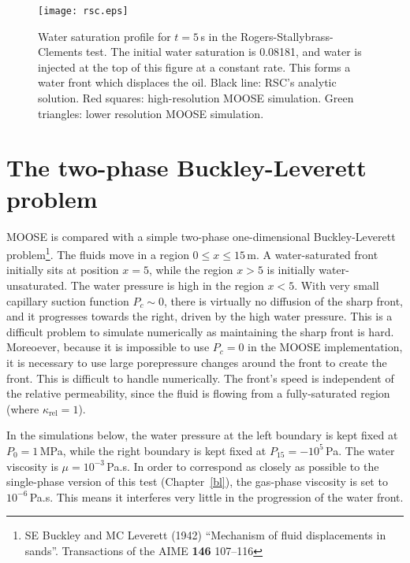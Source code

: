 \documentclass[]{scrreprt}
\begin{document}
\begin{figure}[htb]
\begin{center}
\texttt{[image: rsc.eps]}
\caption{Water saturation profile for $t=5$\,s in the
  Rogers-Stallybrass-Clements test.  The initial water saturation is
  0.08181, and water is injected at the top of this figure at a
  constant rate.  This forms a water front which displaces the oil.
  Black line: RSC's analytic solution.  Red squares: high-resolution
  MOOSE simulation.  Green triangles: lower resolution MOOSE simulation.}
\label{rsc.fig}
\end{center}
\end{figure}







\chapter{The two-phase Buckley-Leverett problem}
\label{bl2}

MOOSE is compared with a simple two-phase one-dimensional
Buckley-Leverett problem\footnote{SE Buckley and MC Leverett (1942)
  ``Mechanism of fluid displacements in sands''.  Transactions of the
  AIME {\bf 146} 107--116}.  The fluids move in a region
$0\leq x\leq 15$\,m.  A water-saturated front initially sits at
position $x=5$, while the region $x>5$ is initially water-unsaturated.
The water pressure is high in the region $x<5$.  With very small
capillary suction function $P_{c} \sim 0$, there is virtually no
diffusion of the sharp front, and it progresses towards the right,
driven by the high water pressure.  This is a difficult problem to
simulate numerically as maintaining the sharp front is hard.
Moreoever, because it is impossible to use $P_{c}=0$ in the MOOSE
implementation, it is necessary to use large porepressure changes
around the front to create the front.  This is
difficult to handle numerically.  The front's speed is independent of
the relative permeability, since the fluid is flowing from a
fully-saturated region (where $\kappa_{\mathrm{rel}}=1$).


In the simulations below, the water pressure at the left boundary is
kept fixed at $P_{0}=1$\,MPa, while the right boundary is kept fixed
at $P_{15}=-10^{5}$\,Pa.  The water viscosity is $\mu = 10^{-3}$\,Pa.s.  In
order to correspond as closely as possible to the single-phase version
of this test (Chapter~\ref{bl}), the gas-phase viscosity is set to
$10^{-6}$\,Pa.s.  This means it interferes very little in the
progression of the water front.
\end{document}
